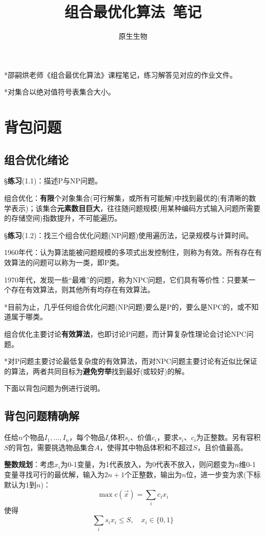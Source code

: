\documentclass[a4paper,UTF8,fontset=windows]{ctexart}
\title{\textbf{组合最优化算法\ 笔记}}
\author{原生生物}
\date{}
\newcommand{\exce}[2]{\S\textbf{练习}(#1)：{\kaishu #2}}
\begin{document}
\maketitle

*邵嗣烘老师《组合最优化算法》课程笔记，练习解答见对应的作业文件。

*对集合以绝对值符号表集合大小。

\tableofcontents

\newpage
\section{背包问题}
\subsection{组合优化绪论}
\exce{1.1}{描述P与NP问题。}

组合优化：\textbf{有限}个对象集合(可行解集，或所有可能解)中找到最优的(有清晰的数学表示)；该集合\textbf{元素数目巨大}，往往随问题规模(用某种编码方式输入问题所需要的存储空间)指数提升，不可能遍历。

\exce{1.2}{找三个组合优化问题(NP问题)使用遍历法，记录规模与计算时间。}

1960年代：认为算法能被问题规模的多项式出发控制住，则称为有效。所有存在有效算法的问题可以称为一类，即P类。

1970年代，发现一些“最难”的问题，称为NPC问题，它们具有等价性：只要某一个存在有效算法，则其他所有均存在有效算法。

*目前为止，几乎任何组合优化问题(NP问题)要么是P的，要么是NPC的，或不知道属于哪类。

组合优化主要讨论\textbf{有效算法}，也即讨论P问题，而计算复杂性理论会讨论NPC问题。

*对P问题主要讨论最低复杂度的有效算法，而对NPC问题主要讨论有近似比保证的算法，两者共同目标为\textbf{避免穷举}找到最好(或较好)的解。

下面以背包问题为例进行说明。

\subsection{背包问题精确解}
任给$n$个物品$I_1,\dots,I_n$，每个物品$I_i$体积$s_i$、价值$c_i$，要求$s_i$、$c_i$为正整数。另有容积$S$的背包，需要挑选物品集合$A$，使得其中物品体积和不超过$S$，且价值最高。

\textbf{整数规划}：考虑$x_i$为0-1变量，为1代表放入，为0代表不放入，则问题变为$n$维0-1变量寻找可行的最优解，输入为$2n+1$个正整数，输出为$n$位，进一步变为求(下标默认为1到$n$)：
$$\max c(\vec{x})=\sum_ic_ix_i$$
使得
$$\sum_is_ix_i\le S,\quad x_i\in\{0,1\}$$
\end{document}
